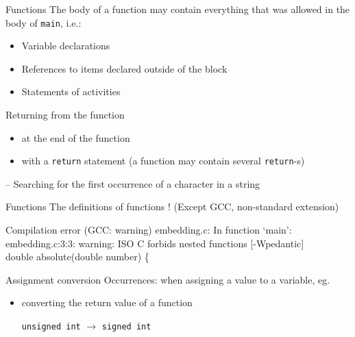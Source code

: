 \documentclass[usenames,dvipsnames,aspectratio=169]{beamer}
\begin{document}
\begin{frame}{Functions}
  \small
  The body of a function may contain everything that was allowed in the body of \texttt{main}, i.e.:
  \begin{itemize}
    \small
    \item Variable declarations
    \item References to items declared outside of the block
    \item Statements of activities
  \end{itemize}
  \small
  Returning from the function
  \begin{itemize}
    \small
    \item at the end of the function
    \item with a \texttt{return} statement (a function may contain several \texttt{return}-s)
  \end{itemize}
  \begin{exampleblock}{ -- Searching for the first occurrence of a character in a string}
    \footnotesize
    \vspace{-.3cm}
    
    \vspace{-.3cm}
  \end{exampleblock}
\end{frame}

\begin{frame}{Functions}
  The definitions of functions ! (Except GCC, non-standard extension)
  \begin{exampleblock}{}
    \small
    \vspace{-.3cm}
    
    \vspace{-.3cm}
  \end{exampleblock}
  \begin{block}{Compilation error (GCC: warning)}
    \scriptsize
embedding.c: In function ‘main’:\\
embedding.c:3:3: warning: ISO C forbids nested functions [-Wpedantic]\\
   double absolute(double number) \{\\
  \end{block}
\end{frame}

\begin{frame}{Assignment conversion}
  Occurrences: when assigning a value to a variable, eg.
  \begin{itemize}
    \item converting the return value of a function\\
    \begin{exampleblock}{ \texttt{unsigned int} $\to$ \texttt{signed int}}
      
    \end{exampleblock}
  \end{itemize}
\end{frame}
\end{document}
